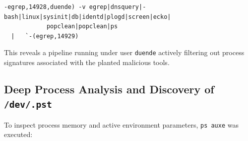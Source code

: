 \begin{lstlisting}[style=terminal]
-egrep,14928,duende) -v egrep|dnsquery|-bash|linux|sysinit|db|identd|plogd|screen|ecko|
            popclean|popclean|ps 
  |   `-(egrep,14929)
\end{lstlisting}

\vspace{1em}

This reveals a pipeline running under user \texttt{duende} actively filtering out process signatures associated with the planted malicious tools.

\subsection{Deep Process Analysis and Discovery of \texttt{/dev/.pst}}

To inspect process memory and active environment parameters, \texttt{ps auxe} was executed:

